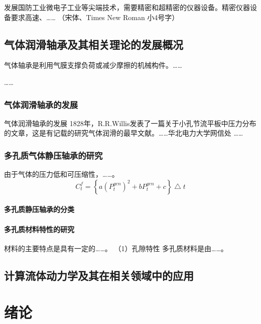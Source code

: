 \documentclass[a4paper, twoside, openany]{NCEPUDoctor}
\begin{document}
  发展国防工业微电子工业等尖端技术，需要精密和超精密的仪器设备。精密仪器设备要求高速、…… （宋体、Times New Roman 小4号字）

  \section{气体润滑轴承及其相关理论的发展概况} %
  气体轴承是利用气膜支撑负荷或减少摩擦的机械构件。……

  ……
  \subsection{气体润滑轴承的发展} %

  气体润滑轴承的发展
  1828年，R.R.Willis发表了一篇关于小孔节流平板中压力分布的文章，这是有记载的研究气体润滑的最早文献。……华北电力大学网信处
  ……
  \subsection{多孔质气体静压轴承的研究}
  由于气体的压力低和可压缩性，……。
  \begin{equation}
  \label{gt1}
   C^f_t=\left \{a(P_t^{gen})^2 + b P_t^{gen}+c\right \} \bigtriangleup t
  \end{equation}
  \subsubsection{多孔质静压轴承的分类}


  \subsubsection{多孔质材料特性的研究}
  材料的主要特点是具有一定的……。
  （1）孔隙特性 多孔质材料是由……。



  \section{计算流体动力学及其在相关领域中的应用}
  \clearpage

  \clearpage
  \chapter{绪论}
\end{document}

